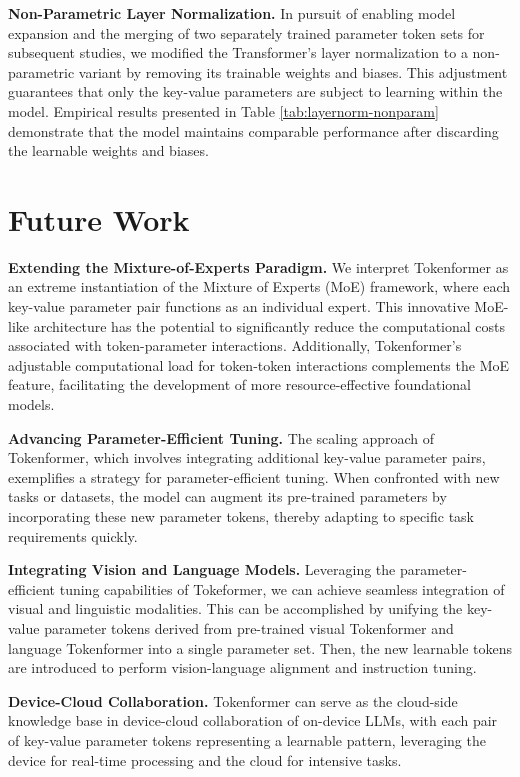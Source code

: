 \documentclass{article} %
\newcommand{\ourmethod}{Tokenformer\xspace}
\begin{document}
\textbf{Non-Parametric Layer Normalization.} In pursuit of enabling model expansion and the merging of two separately trained parameter token sets for subsequent studies, we modified the Transformer's layer normalization to a non-parametric variant by removing its trainable weights and biases. This adjustment guarantees that only the key-value parameters are subject to learning within the model. Empirical results presented in Table \ref{tab:layernorm-nonparam} demonstrate that the model maintains comparable performance after discarding the learnable weights and biases.

\section{Future Work}
\textbf{Extending the Mixture-of-Experts Paradigm.} We interpret \ourmethod as an extreme instantiation of the Mixture of Experts (MoE) framework, where each key-value parameter pair functions as an individual expert. This innovative MoE-like architecture has the potential to significantly reduce the computational costs associated with token-parameter interactions. Additionally, \ourmethod's adjustable computational load for token-token interactions complements the MoE feature, facilitating the development of more resource-effective foundational models. 

\textbf{Advancing Parameter-Efficient Tuning.} The scaling approach of \ourmethod, which involves integrating additional key-value parameter pairs, exemplifies a strategy for parameter-efficient tuning. When confronted with new tasks or datasets, the model can augment its pre-trained parameters by incorporating these new parameter tokens, thereby adapting to specific task requirements quickly.

\textbf{Integrating Vision and Language Models.} Leveraging the parameter-efficient tuning capabilities of Tokeformer, we can achieve seamless integration of visual and linguistic modalities. This can be accomplished by unifying the key-value parameter tokens derived from pre-trained visual \ourmethod and language \ourmethod into a single parameter set. Then, the new learnable tokens are introduced to perform vision-language alignment and instruction tuning.

\textbf{Device-Cloud Collaboration.} \ourmethod can serve as the cloud-side knowledge base in device-cloud collaboration of on-device LLMs, with each pair of key-value parameter tokens representing a learnable pattern, leveraging the device for real-time processing and the cloud for intensive tasks.
\end{document}
